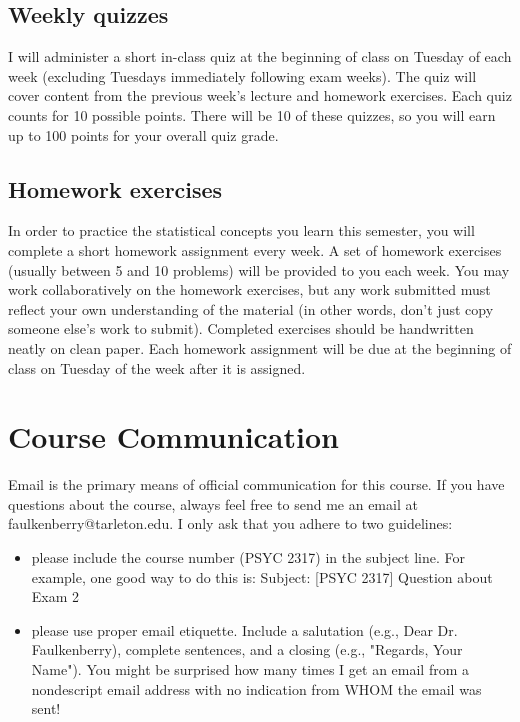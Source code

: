\documentclass[10pt]{article}
\begin{document}
\subsection*{Weekly quizzes}
\label{sec:org39ff782}
I will administer a short in-class quiz at the beginning of class on Tuesday of each week (excluding Tuesdays immediately following exam weeks). The quiz will cover content from the previous week's lecture and homework exercises. Each quiz counts for 10 possible points.  There will be 10 of these quizzes, so you will earn up to 100 points for your overall quiz grade.

\subsection*{Homework exercises}
\label{sec:org42d7bae}
In order to practice the statistical concepts you learn this semester, you will complete a short homework assignment every week.  A set of homework exercises (usually between 5 and 10 problems) will be provided to you each week.  You may work collaboratively on the homework exercises, but any work submitted must reflect your own understanding of the material (in other words, don't just copy someone else's work to submit).  Completed exercises should be handwritten neatly on clean paper.  Each homework assignment will be due at the beginning of class on Tuesday of the week after it is assigned.

\section*{Course Communication}
\label{sec:org0f957ce}

Email is the primary means of official communication for this course.  If you have questions about the course, always feel free to send me an email at faulkenberry@tarleton.edu.  I only ask that you adhere to two guidelines:
\begin{itemize}
\item please include the course number (PSYC 2317) in the subject line.  For example, one good way to do this is:  Subject: [PSYC 2317] Question about Exam 2
\item please use proper email etiquette.  Include a salutation (e.g., Dear Dr. Faulkenberry), complete sentences, and a closing (e.g., "Regards, Your Name").  You might be surprised how many times I get an email from a nondescript email address with no indication from WHOM the email was sent!
\end{itemize}
\end{document}
